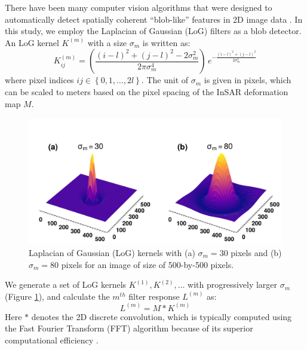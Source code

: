 There have been many computer vision algorithms that were designed to automatically detect spatially coherent ``blob-like'' features in 2D image data \cite{Lindeberg1993DetectingSalientBlob, Lindeberg1998FeatureDetectionAutomatic, Lowe2004DistinctiveImageFeatures}. In this study, we employ the Laplacian of Gaussian (LoG) filters as a blob detector. An LoG kernel $K^{(m)}$ with a size $\sigma_m$ is written as:
\begin{equation}
	K^{(m)}_{ij} = \left(\frac{(i - l)^2 + (j - l)^2 - 2\sigma_m^2}{2 \pi \sigma_m^4}\right) \, e^{-\frac{ (i - l)^2 + (j - l)^2}{2 \sigma_m^2}} \label{eq:log-kernel}
\end{equation}
where pixel indices $ij  \in \left\lbrace 0, 1, \ldots, 2l \right\rbrace$. The unit of $\sigma_m$ is given in pixels, which can be scaled to meters based on the pixel spacing of the InSAR deformation map $M$.



\begin{figure}
	\centering
	\includegraphics[width=0.59\linewidth]{figures/chapter6-blobs/figure1_log_examples.pdf}
	\caption{
		Laplacian of Gaussian (LoG) kernels with (a) $\sigma_m=30$ pixels and (b) $\sigma_m=80$ pixels for an image of size of 500-by-500 pixels.
	}
	\label{fig:log-kernel}
\end{figure}



We generate a set of LoG kernels $K^{(1)}, K^{(2)}, \ldots$ with progressively larger $\sigma_m$ (Figure \ref{fig:log-kernel}), and calculate the $m^{th}$ filter response $ L^{(m)} $ as:
\begin{equation}
	L^{(m)} = M \ast K^{(m)}  \label{eq:log-layer-conv}
\end{equation}
Here $*$ denotes the 2D discrete convolution, which is typically computed using the Fast Fourier Transform (FFT) algorithm because of its superior computational efficiency \cite{Szeliski2022ComputerVision}.



